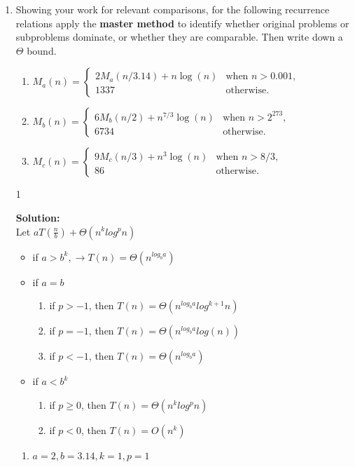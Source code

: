 \documentclass[9pt]{article}
\def\solutions{1}
\begin{document}
\begin{enumerate}
\item Showing your work for relevant comparisons, for the following recurrence relations apply the \textbf{master method} to identify whether original problems or subproblems dominate, or whether they are comparable.  Then write down a $\Theta$ bound.
  \begin{enumerate}
  \item $M_a(n) = \begin{cases}
    2M_a(n/3.14) + n\log(n) & \text{when } n > 0.001, \\
    1337 & \text{otherwise.}
  \end{cases}$
  \item $M_b(n) = \begin{cases}
    6M_b(n/2) + n^{7/3}\log(n) & \text{when } n > 2^{273}, \\
    6734 & \text{otherwise.}
  \end{cases}$
  \item $M_c(n) = \begin{cases}
    9M_c(n/3) + n^3\log(n) & \text{when } n > 8/3, \\
    86 & \text{otherwise.}
    \end{cases}$
  \end{enumerate}

\if\solutions1
\vspace{2mm}

\textbf{Solution:} \\

Let $aT(\frac{n}{b}) + \Theta(n^klog^pn)$
\begin{itemize}
  \item if $a> b^k, \rightarrow T(n) = \Theta(n^{log_ba})$
  \item if $a=b$
  \begin{enumerate}
    \item  if $p>-1$, then $T(n) = \Theta(n^{log_ba}log^{k+1}n)$
    \item if $p = -1$, then $T(n) = \Theta(n^{log_ba}log (n))$
    \item if $p<-1$, then $T(n) = \Theta (n^{log_ba})$
  \end{enumerate}
  \item if $a < b^k$
  \begin{enumerate}
    \item if $p \geq 0$, then $T(n) = \Theta(n^k log^p n)$
    \item if $p < 0$, then $T(n) = O (n^k)$
  \end{enumerate}
\end{itemize}
\begin{enumerate} 
  \item $a = 2, b=3.14,k=1,p=1$
  

\end{enumerate}
\end{enumerate}
\end{document}
